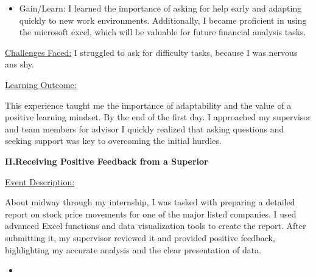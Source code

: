 \documentclass{article}
\begin{document}
\begin{titlepage}
\begin{titlepage}
\begin{flushleft}
\begin{flushleft}
\begin{itemize}
\item 
Gain/Learn:
I learned the importance of asking for help early and adapting quickly to new work environments. Additionally, I became proficient in using the microsoft excel, which will be valuable for future financial analysis tasks.
\end{itemize}

\underline{Challenges Faced:}
I struggled to ask for difficulty tasks, because I was nervous ans shy.
\vspace{0.2cm}

\underline{Learning Outcome:}

This experience taught me the importance of adaptability and the value of a positive learning mindset. By the end of the first day. I approached my supervisor and team members for advisor I quickly realized that asking questions and seeking support was key to overcoming the initial hurdles. 
\vspace{0.5cm}

\textbf{II.Receiving Positive Feedback from a Superior}
\vspace{0.3cm}

\underline{Event Description:}

About midway through my internship, I was tasked with preparing a detailed report on stock price movements for one of the major listed companies. I used advanced Excel functions and data visualization tools to create the report. After submitting it, my supervisor reviewed it and provided positive feedback, highlighting my accurate analysis and the clear presentation of data.
\vspace{0.15cm}

\begin{itemize}
    \item 


\end{itemize}
\end{flushleft}
\end{flushleft}
\end{titlepage}
\end{titlepage}
\end{document}
